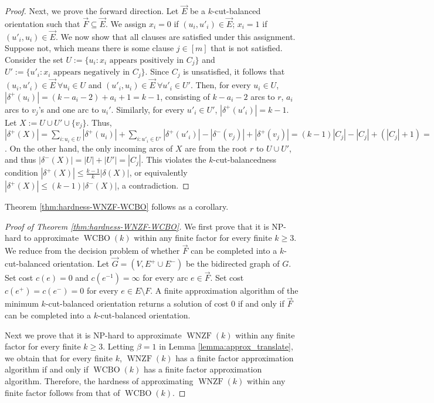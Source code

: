 \documentclass[11pt]{article}
\begin{document}
\begin{proof}
    Next, we prove the forward direction. Let $\vec{E}$ be a $k$-cut-balanced orientation such that $\vec{F}\subseteq \vec{E}$. We assign $x_i=0$ if $(u_i,u'_i)\in \vec{E}$; $x_i=1$ if $(u'_i,u_i)\in \vec{E}$. We now show that all clauses are satisfied under this assignment. Suppose not, which means there is some clause $j\in [m]$ that is not satisfied. Consider the set $U:=\{u_i:x_i \text{ appears positively in } C_j\}$ and $U':=\{u'_i:x_i \text{ appears negatively in } C_j\}$. Since $C_j$ is unsatisfied, it follows that $(u_i,u'_i)\in \vec{E}\ \forall u_i\in U$ and $(u'_i,u_i)\in \vec{E}\ \forall u'_i\in U'$. Then, for every $u_i\in U$, $|\delta^+(u_i)|=(k-a_i-2)+a_i+1=k-1$, consisting of $k-a_i-2$ arcs to $r$, $a_i$ arcs to $v_j$'s and one arc to $u_i'$. Similarly,  for every $u'_i\in U'$, $|\delta^+(u'_i)|=k-1$. Let $X:=U\cup U'\cup \{v_j\}$. Thus, $|\delta^+(X)|=\sum_{i:u_i\in U}|\delta^+(u_i)|+\sum_{i:u'_i\in U'}|\delta^+(u'_i)|-|\delta^-(v_j)|+|\delta^+(v_j)|=(k-1)|C_j|-|C_j|+(|C_j|+1)=(k-1)|C_j|+1$. On the other hand, the only incoming arcs of $X$ are from the root $r$ to $U\cup U'$, and thus $|\delta^-(X)|=|U|+|U'|=|C_j|$. This violates the $k$-cut-balancedness condition $|\delta^+(X)|\leq \frac{k-1}{k}|\delta(X)|$, or equivalently $|\delta^+(X)|\leq (k-1)|\delta^-(X)|$, a contradiction.
\end{proof}

Theorem \ref{thm:hardness-WNZF-WCBO} follows as a corollary.
\begin{proof}[Proof of Theorem \ref{thm:hardness-WNZF-WCBO}]
    We first prove that it is NP-hard to approximate $\operatorname{WCBO}(k)$ within any finite factor for every finite $k
    \geq 3$. We reduce from the decision problem of whether $\vec{F}$ can be completed into a $k$-cut-balanced orientation. Let $\vec{G}=(V,E^+\cup E^-)$ be the bidirected graph of $G$. Set cost $c(e)=0$ and $c(e^{-1})=\infty$ for every arc $e\in \vec{F}$. Set cost $c(e^+)=c(e^-)=0$ for every $e\in E\setminus F$. A finite approximation algorithm of the minimum $k$-cut-balanced orientation returns a solution of cost $0$ if and only if $\vec{F}$ can be completed into a $k$-cut-balanced orientation.
    
    Next we prove that it is NP-hard to approximate  $\operatorname{WNZF}(k)$ within any finite factor for every finite $k
    \geq 3$. Letting $\beta=1$ in Lemma \ref{lemma:approx_translate}, we obtain that for every finite $k$, $\operatorname{WNZF}(k)$ has a finite factor approximation algorithm if and only if $\operatorname{WCBO}(k)$ has a finite factor approximation algorithm. Therefore, the hardness of approximating $\operatorname{WNZF}(k)$ within any finite factor follows from that of $\operatorname{WCBO}(k)$.
\end{proof}
\end{document}
